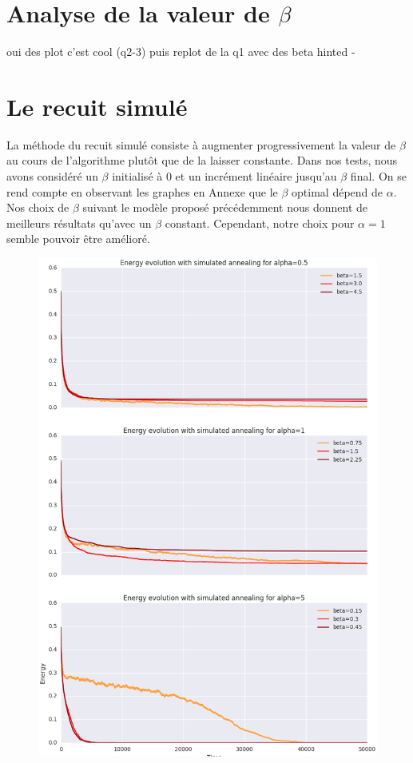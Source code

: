 \documentclass[twocolumn]{article}
\begin{document}
	\section{Analyse de la valeur de $\beta$}
		oui des plot c'est cool (q2-3)
		puis replot de la q1 avec des beta hinted
		- 
	\section{Le recuit simulé}
		La méthode du recuit simulé consiste à augmenter progressivement la valeur de $\beta$ au cours de l'algorithme plutôt que de la laisser constante. Dans nos tests, nous avons considéré un $\beta$ initialisé à 0 et un incrément linéaire jusqu'au $\beta$ final.
		On se rend compte en observant les graphes en Annexe que le $\beta$ optimal dépend de $\alpha$.  Nos choix de $\beta$ suivant le modèle proposé précédemment nous donnent de meilleurs résultats qu'avec un $\beta$ constant. Cependant, notre choix pour $\alpha = 1$ semble pouvoir être amélioré.
		
		\begin{figure}
		\includegraphics[width=\columnwidth]{../tobekept/ex1_sim_1683536997971113732-r.png}
		\end{figure}
		
\end{document}
